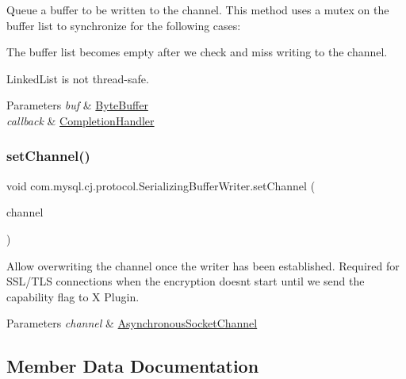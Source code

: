 Queue a buffer to be written to the channel. This method uses a mutex on the buffer list to synchronize for the following cases\+: 
\begin{DoxyItemize}
\item The buffer list becomes empty after we check and miss writing to the channel. 
\item Linked\+List is not thread-\/safe. 
\end{DoxyItemize}


\begin{DoxyParams}{Parameters}
{\em buf} & \mbox{\hyperlink{}{Byte\+Buffer}} \\
\hline
{\em callback} & \mbox{\hyperlink{}{Completion\+Handler}} \\
\hline
\end{DoxyParams}
\mbox{\label{classcom_1_1mysql_1_1cj_1_1protocol_1_1_serializing_buffer_writer_ac59dda63c81fa3c5f00f82924b1c63c5}} 
\subsubsection{\texorpdfstring{set\+Channel()}{setChannel()}}
{\footnotesize\ttfamily void com.\+mysql.\+cj.\+protocol.\+Serializing\+Buffer\+Writer.\+set\+Channel (\begin{DoxyParamCaption}\item[{Asynchronous\+Socket\+Channel}]{channel }\end{DoxyParamCaption})}

Allow overwriting the channel once the writer has been established. Required for S\+S\+L/\+T\+LS connections when the encryption doesn\textquotesingle{}t start until we send the capability flag to X Plugin.


\begin{DoxyParams}{Parameters}
{\em channel} & \mbox{\hyperlink{}{Asynchronous\+Socket\+Channel}} \\
\hline
\end{DoxyParams}


\subsection{Member Data Documentation}
\mbox{\label{classcom_1_1mysql_1_1cj_1_1protocol_1_1_serializing_buffer_writer_a2c945e406ea10c40aa113a7c111570c6}} 
